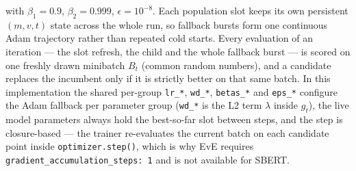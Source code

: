 with $\beta_1 = 0.9$, $\beta_2 = 0.999$, $\epsilon = 10^{-8}$. Each population slot keeps its own persistent $(m, v, t)$ state across the whole run, so fallback bursts form one continuous Adam trajectory rather than repeated cold starts. Every evaluation of an iteration — the slot refresh, the child and the whole fallback burst — is scored on one freshly drawn minibatch $B_t$ (common random numbers), and a candidate replaces the incumbent only if it is strictly better on that same batch. In this implementation the shared per-group \texttt{lr\_*}, \texttt{wd\_*}, \texttt{betas\_*} and \texttt{eps\_*} configure the Adam fallback per parameter group (\texttt{wd\_*} is the L2 term $\lambda$ inside $g_t$), the live model parameters always hold the best-so-far slot between steps, and the step is closure-based — the trainer re-evaluates the current batch on each candidate point inside \texttt{optimizer.step()}, which is why EvE requires \texttt{gradient\_accumulation\_steps: 1} and is not available for SBERT.


